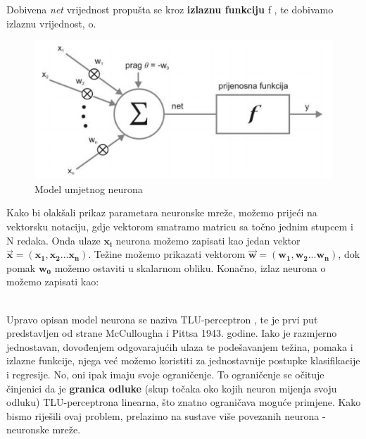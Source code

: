 \begin{myequation}%
\end{myequation}


\noindent Dobivena \textit{net} vrijednost propušta se kroz \textbf{izlaznu funkciju} f , te dobivamo izlaznu vrijednost, o. \citep{uilectures}\citep{neuronskeMreze2008FER}\\

\begin{figure}[htb]
\centering
\includegraphics[width=12cm]{slike/umjetni_neuron.png}
\caption{Model umjetnog neurona \citep{neuronskeMreze2008FER}}
\label{fig:fer-logo}
\end{figure}
\textbf{}

\noindent Kako bi olakšali prikaz parametara neuronske mreže, možemo prijeći na vektorsku notaciju, gdje vektorom smatramo matricu sa točno jednim stupcem i N redaka. Onda ulaze $\mathbf{x_{i}}$ neurona možemo zapisati kao jedan vektor  $\mathbf{\overrightarrow{x} = (x_{1},x_{2}...x_{n})}$. Težine možemo prikazati vektorom $\mathbf{\overrightarrow{w} = (w_{1},w_{2}...w_{n})}$, dok pomak $\mathbf{w_{0}}$ možemo ostaviti u skalarnom obliku. Konačno, izlaz neurona o možemo zapisati kao:

\begin{myequation}%
\end{myequation}

\\
\noindent Upravo opisan model neurona se naziva TLU-perceptron , te je prvi put predstavljen od strane McCullougha i Pittsa 1943. godine. Iako je razmjerno jednostavan, dovođenjem odgovarajućih ulaza te podešavanjem težina, pomaka i izlazne funkcije, njega već možemo koristiti za jednostavnije postupke klasifikacije i regresije. No, oni ipak imaju svoje ograničenje. To ograničenje se očituje činjenici da je \textbf{granica odluke} (skup točaka oko kojih neuron mijenja svoju odluku) TLU-perceptrona linearna, što znatno ograničava moguće primjene. Kako bismo riješili ovaj problem, prelazimo na sustave više povezanih neurona - neuronske mreže.

